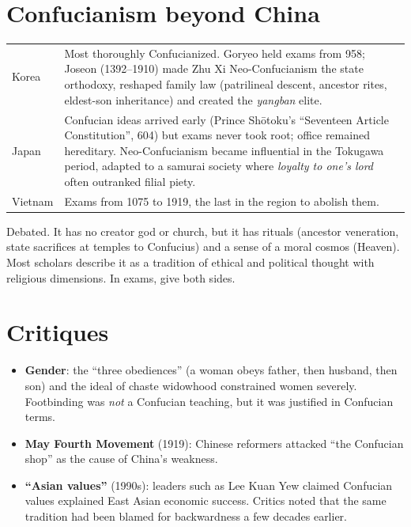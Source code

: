 \section{Confucianism beyond China}

\begin{center}
\begin{tabular}{lp{11cm}}
\toprule
Korea & Most thoroughly Confucianized. Goryeo held exams from 958; Joseon (1392--1910) made
Zhu Xi Neo-Confucianism the state orthodoxy, reshaped family law (patrilineal descent,
ancestor rites, eldest-son inheritance) and created the \emph{yangban} elite. \\
Japan & Confucian ideas arrived early (Prince Shōtoku's ``Seventeen Article
Constitution'', 604) but exams never took root; office remained hereditary. Neo-Confucianism
became influential in the Tokugawa period, adapted to a samurai society where
\emph{loyalty to one's lord} often outranked filial piety. \\
Vietnam & Exams from 1075 to 1919, the last in the region to abolish them. \\
\bottomrule
\end{tabular}
\end{center}

\begin{important}
Debated. It has no creator god or church, but it has rituals (ancestor veneration, state
sacrifices at temples to Confucius) and a sense of a moral cosmos (Heaven). Most scholars
describe it as a tradition of ethical and political thought with religious dimensions.
In exams, give both sides.
\end{important}

\section{Critiques}

\begin{itemize}
  \item \textbf{Gender}: the ``three obediences'' (a woman obeys father, then husband,
        then son) and the ideal of chaste widowhood constrained women severely. Footbinding
        was \emph{not} a Confucian teaching, but it was justified in Confucian terms.
  \item \textbf{May Fourth Movement} (1919): Chinese reformers attacked ``the Confucian
        shop'' as the cause of China's weakness.
  \item \textbf{``Asian values''} (1990s): leaders such as Lee Kuan Yew claimed Confucian
        values explained East Asian economic success. Critics noted that the same
        tradition had been blamed for backwardness a few decades earlier.
\end{itemize}

